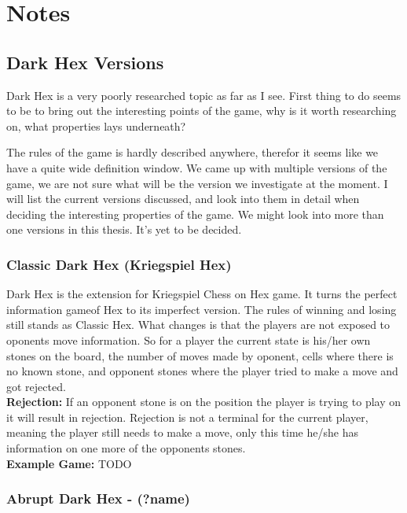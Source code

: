 \section{Notes} \label{section:notes}

\subsection{Dark Hex Versions}

Dark Hex is a very poorly researched topic as far as I see. First thing to do seems to be to bring out the interesting points of the game, why is it worth researching on, what properties lays underneath?

The rules of the game is hardly described anywhere, therefor it seems like we have a quite wide definition window. We came up with multiple versions of the game, we are not sure what will be the version we investigate at the moment.
I will list the current versions discussed, and look into them in detail when deciding the interesting properties of the game. We might look into more than one versions in this thesis. It's yet to be decided.

\subsubsection{Classic Dark Hex (Kriegspiel Hex)}
Dark Hex is the extension for Kriegspiel Chess on Hex game. It turns the perfect information gameof Hex to its imperfect version. The rules of winning and losing still stands as Classic Hex. What changes is that the players are not exposed to oponents move information. So for a player the current state is his/her own stones on the board, the number of moves made by oponent, cells where there is no known stone, and opponent stones where the player tried to make a move and got rejected.\\

{\bf Rejection:} If an opponent stone is on the position the player is trying to play on it will result in rejection. Rejection is not a terminal for the current player, meaning the player still needs to make a move, only this time he/she has information on one more of the opponents stones.\\

{\bf Example Game:}
TODO

\subsubsection{Abrupt Dark Hex - (?name)}

